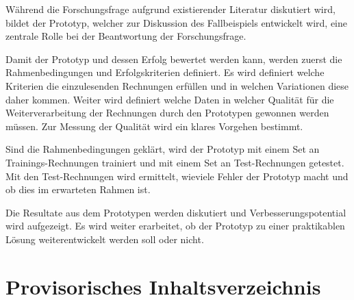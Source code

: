\documentclass{hwz}
\begin{document}
Während die Forschungsfrage aufgrund existierender Literatur diskutiert wird, bildet der Prototyp, welcher zur Diskussion des Fallbeispiels entwickelt wird, eine zentrale Rolle bei der Beantwortung der Forschungsfrage.

Damit der Prototyp und dessen Erfolg bewertet werden kann, werden zuerst die Rahmenbedingungen und Erfolgskriterien definiert. Es wird definiert welche Kriterien die einzulesenden Rechnungen erfüllen und in welchen Variationen diese daher kommen. Weiter wird definiert welche Daten in welcher Qualität für die Weiterverarbeitung der Rechnungen durch den Prototypen gewonnen werden müssen. Zur Messung der Qualität wird ein klares Vorgehen bestimmt.

Sind die Rahmenbedingungen geklärt, wird der Prototyp mit einem Set an Trainings-Rechnungen trainiert und mit einem Set an Test-Rechnungen getestet. Mit den Test-Rechnungen wird ermittelt, wieviele Fehler der Prototyp macht und ob dies im erwarteten Rahmen ist.

Die Resultate aus dem Prototypen werden diskutiert und Verbesserungspotential wird aufgezeigt. Es wird weiter erarbeitet, ob der Prototyp zu einer praktikablen Lösung weiterentwickelt werden soll oder nicht.
 
\newpage
\section{Provisorisches Inhaltsverzeichnis} 

\end{document}

